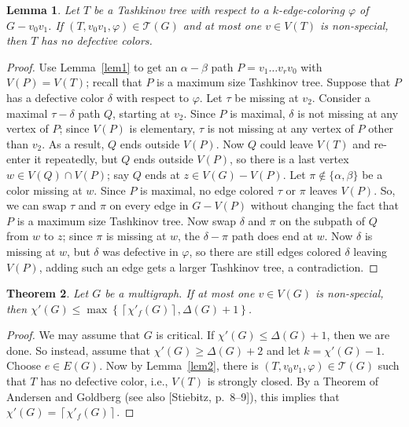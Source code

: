 \documentclass[12pt]{amsart}
\theoremstyle{plain}
\newtheorem{thm}{Theorem}
\newtheorem{lem}[thm]{Lemma}
\theoremstyle{definition}
\theoremstyle{remark}
\newcommand{\fancy}[1]{\mathcal{#1}}
\newcommand{\T}{\fancy{T}}
\newcommand{\set}[1]{\left\{ #1 \right\}}
\newcommand{\ceil}[1]{\left\lceil#1\right\rceil}
\newcommand{\vph}{\varphi}
\begin{document}
\begin{lem}\label{AtMostOneNonSpecial}
Let $T$ be a Tashkinov tree with respect to a $k$-edge-coloring $\vph$ of $G - v_0v_1$.  If $(T, v_0v_1, \vph) \in \T(G)$ and at most one $v \in V(T)$ is
non-special, then $T$ has no defective colors.
\label{lem2}
\end{lem}
\begin{proof}
Use Lemma~\ref{lem1} to get an $\alpha-\beta$ path $P = v_1\ldots v_rv_0$ with
$V(P) = V(T)$; recall that $P$ is a maximum size Tashkinov tree.  Suppose that
$P$ has a defective color $\delta$ with respect to $\vph$. Let $\tau$ be
missing at $v_2$. Consider a maximal $\tau-\delta$ path $Q$, starting at $v_2$.  
Since $P$ is maximal, $\delta$ is not missing at any vertex of $P$;
since $V(P)$ is elementary, $\tau$ is not missing at any vertex of $P$ other 
than $v_2$.  As a result, $Q$ ends outside $V(P)$.  Now $Q$ could leave
$V(T)$ and re-enter it repeatedly, %
but $Q$ ends outside $V(P)$, so there is a last vertex $w \in V(Q) \cap V(P)$;
say $Q$ ends at $z \in V(G) - V(P)$.  Let $\pi \notin \{\alpha, \beta\}$ be a
color missing at $w$.  Since
$P$ is maximal, no edge colored $\tau$ or $\pi$ leaves $V(P)$.  So, we can
swap $\tau$ and $\pi$ on every edge in $G - V(P)$ without changing the fact that
$P$ is a maximum size Tashkinov tree.  Now swap $\delta$ and $\pi$ on the
subpath of $Q$ from $w$ to $z$;
since $\pi$ is missing at $w$, the $\delta-\pi$ path does end at $w$.  Now
$\delta$ is missing at $w$, but $\delta$ was defective in $\vph$, so there are
still edges colored $\delta$ leaving $V(P)$, adding such an edge gets a larger
Tashkinov tree, a contradiction.
\end{proof}

\begin{thm}\label{AllSpecialImpliesElementary}
Let $G$ be a multigraph.
If at most one $v \in V(G)$ is non-special, then
$\chi'(G) \le \max \set{\ceil{\chi'_f(G)}, \Delta(G) + 1}$.
\end{thm}
\begin{proof}
We may assume that $G$ is critical.
If $\chi'(G)\le \Delta(G)+1$, then we are done.
So instead, assume that $\chi'(G)\ge \Delta(G)+2$ and let $k=\chi'(G)-1$.
Choose $e\in E(G)$.  Now by Lemma~\ref{lem2}, there is $(T, v_0v_1, \vph) \in \T(G)$ such that $T$ has no defective color, i.e.,
$V(T)$ is strongly closed.  By a Theorem of Andersen and Goldberg (see also
[Stiebitz, p.~8--9]), this implies that $\chi'(G)=\ceil{\chi'_f(G)}$.
\end{proof}
\end{document}
